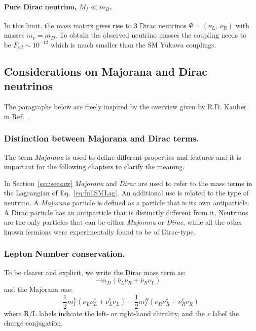 \paragraph {Pure Dirac neutrino, $M_I \ll m_D$.}
In this limit, the mass matrix gives rise to 3 Dirac neutrinos $\Psi = (\nu_L,\:\bar{\nu}_R)$ with masses $m_\nu = m_D$. To obtain the observed neutrino masses the coupling needs to be $F_{\alpha I} \sim 10^{-12}$ which is much smaller than the SM Yukawa couplings.

\subsection{Considerations on Majorana and Dirac neutrinos}\label{sec:c3majo_dirac}
The paragraphs below are freely inspired by the overview given by
R.D. Kauber in Ref.~\cite{webpage_seesaw}.
\subsubsection {Distinction between Majorana and Dirac terms.}\label{sec:majo_dirac}
The term \emph{Majorana} is used to define different properties and features and it is important for the following chapters to clarify the meaning.

In Section~\ref{sec:seesaw} \emph{Majorana} and \emph{Dirac} are used to
refer to the mass terms in the Lagrangian of
Eq.~\ref{eq:fullSMLag}. An additional use is related to the type of
neutrino. A \emph{Majorana} particle is defined as a particle that is
its own antiparticle.  A Dirac particle has an antiparticle that is
distinctly different from it. Neutrinos are the only particles that can be either \emph{Majorana} or \emph{Dirac}, while all the other known fermions were experimentally found to be of Dirac-type.

\subsubsection{Lepton Number conservation.}\label{sec:lnv_lnc}
To be clearer and explicit, we write the Dirac mass term as:
\begin{equation}
\label{eq:c3dirac}
-m_D (\bar{\nu}_L\nu_R + \bar{\nu}_R\nu_L)
\end{equation}
and the Majorana one:
\begin{equation}
\label{eq:c3majorana}
-\frac{1}{2}m^{L}_{I}(\bar{\nu}_L\nu^{c}_L + \bar{\nu}_L^{c}\nu_L) -\frac{1}{2}m^{R}_{I} (\bar{\nu}_R\nu^{c}_R + \bar{\nu}_R^{c}\nu_R)
\end{equation}
where R/L labels indicate the left- or right-hand chirality, and the
\emph{c} label the charge conjugation.

